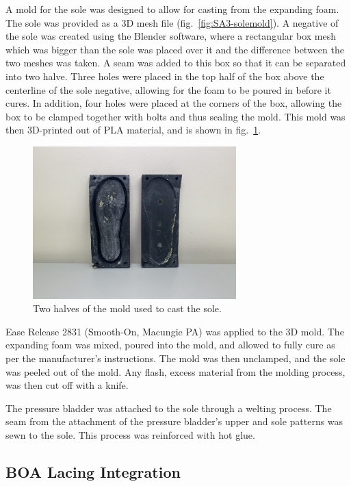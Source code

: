 \documentclass[defaultstyle,11pt]{thesis}
\begin{document}
A mold for the sole was designed to allow for casting from the expanding foam.
The sole was provided as a 3D mesh file (fig.~\ref{fig:SA3-solemold}).
A negative of the sole was created using the Blender software, where a rectangular box mesh which was bigger than the sole was placed over it and the difference between the two meshes was taken.
A seam was added to this box so that it can be separated into two halve.
Three holes were placed in the top half of the box above the centerline of the sole negative, allowing for the foam to be poured in before it cures.
In addition, four holes were placed at the corners of the box, allowing the box to be clamped together with bolts and thus sealing the mold.
This mold was then 3D-printed out of PLA material, and is shown in fig.~\ref{fig:SA3-solemoldhalves}.

\begin{figure}
\hypertarget{fig:SA3-solemoldhalves}{%
\centering
\includegraphics[width=0.7\textwidth,height=\textheight]{../fig/SA3/Sole_Mold.jpg}
\caption{Two halves of the mold used to cast the sole.}\label{fig:SA3-solemoldhalves}
}
\end{figure}

Ease Release 2831 (Smooth-On, Macungie PA) was applied to the 3D mold.
The expanding foam was mixed, poured into the mold, and allowed to fully cure as per the manufacturer's instructions.
The mold was then unclamped, and the sole was peeled out of the mold.
Any flash, excess material from the molding process, was then cut off with a knife.

The pressure bladder was attached to the sole through a welting process.
The seam from the attachment of the pressure bladder's upper and sole patterns was sewn to the sole.
This process was reinforced with hot glue.

\hypertarget{boa-lacing-integration}{%
\subsection{BOA Lacing Integration}\label{boa-lacing-integration}}
\end{document}

